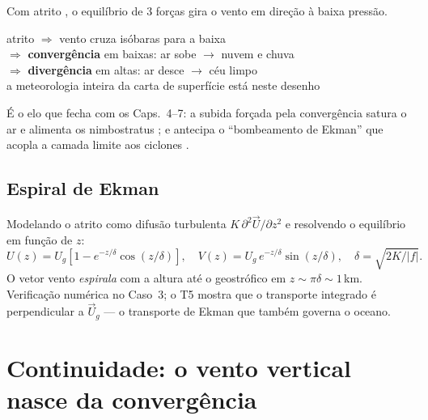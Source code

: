 \documentclass[11pt]{article}
\begin{document}

Com atrito , o equilíbrio de 3 forças
gira o vento em direção à baixa pressão.

\begin{noquadro}
atrito $\Rightarrow$ vento cruza isóbaras para a baixa\\
$\Rightarrow$ \textbf{convergência} em baixas: ar sobe $\to$ nuvem e
chuva\\
$\Rightarrow$ \textbf{divergência} em altas: ar desce $\to$ céu limpo\\[2pt]
a meteorologia inteira da carta de superfície está neste desenho
\end{noquadro}

É o elo que fecha com os Caps.~4--7: a subida forçada pela convergência
satura o ar  e alimenta os nimbostratus
; e antecipa o ``bombeamento de Ekman'' que
acopla a camada limite aos ciclones .

\subsection{Espiral de Ekman}

\begin{formadif}
Modelando o atrito como difusão turbulenta
$K\,\partial^2\vec U/\partial z^2$ e resolvendo o equilíbrio em função
de $z$:
\[ U(z) = U_g\left[1 - e^{-z/\delta}\cos(z/\delta)\right],\quad
   V(z) = U_g\,e^{-z/\delta}\sin(z/\delta),\quad
   \delta = \sqrt{2K/|f|}. \]
O vetor vento \emph{espirala} com a altura até o geostrófico em
$z \sim \pi\delta \sim 1$\,km. Verificação numérica no Caso~3; o T5
mostra que o transporte integrado é perpendicular a $\vec U_g$ — o
transporte de Ekman que também governa o oceano.
\end{formadif}

\section{Continuidade: o vento vertical nasce da convergência}
\label{sec:continuidade}

\end{document}
